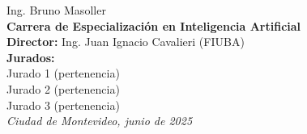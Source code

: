 \begin{titlepage}
\begin{flushright}
        {\fontsize{20pt}{25pt}\selectfont
        Ing. Bruno Masoller} \\[1cm]

        {\fontsize{15pt}{20pt}\selectfont
            \textbf{Carrera de Especialización en Inteligencia Artificial}
        } \\[2cm]

        {\fontsize{11pt}{15pt}\selectfont
        \textbf{Director:} Ing. Juan Ignacio Cavalieri (FIUBA)} \\[1cm]

        {\fontsize{11pt}{15pt}\selectfont
        \textbf{Jurados:}} \\[0.5cm]
        {\fontsize{11pt}{15pt}\selectfont
        Jurado 1 (pertenencia)} \\ 
        {\fontsize{11pt}{15pt}\selectfont
        Jurado 2 (pertenencia)} \\ 
        {\fontsize{11pt}{15pt}\selectfont
        Jurado 3 (pertenencia)} \\[2cm]

        {\itshape\fontsize{10pt}{12pt}\selectfont
        Ciudad de Montevideo, junio de 2025} %
    \end{flushright}
\end{titlepage}
